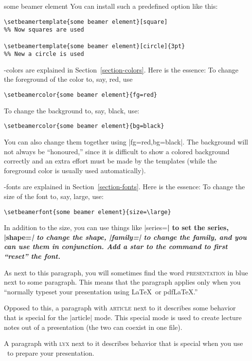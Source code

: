 \begin{element}{some beamer element}
  You can install such a predefined option like this:
\begin{verbatim}
\setbeamertemplate{some beamer element}[square]
%% Now squares are used

\setbeamertemplate{some beamer element}[circle]{3pt}
%% New a circle is used
\end{verbatim}

  \beamer-colors are explained in Section~\ref{section-colors}. Here is the essence: To change the foreground of the color to, say, red, use
\begin{verbatim}
\setbeamercolor{some beamer element}{fg=red}
\end{verbatim}

  To change the background to, say, black, use:
\begin{verbatim}
\setbeamercolor{some beamer element}{bg=black}
\end{verbatim}

  You can also change them together using |fg=red,bg=black|. The background will not always be ``honoured,'' since it is difficult to show a colored background correctly and an extra effort must be made by the templates (while the foreground color is usually used automatically).

  \beamer-fonts are explained in Section~\ref{section-fonts}. Here is the essence: To change the size of the font to, say, large, use:
\begin{verbatim}
\setbeamerfont{some beamer element}{size=\large}
\end{verbatim}

  In addition to the size, you can use things like |series=\bfseries| to set the series, |shape=\itshape| to change the shape, |family=\sffamily| to change the family, and you can use them in conjunction. Add a star to the command to first ``reset'' the font.
\end{element}

\beamernote
As next to this paragraph, you will sometimes find the word \textsc{presentation} in blue next to some paragraph. This means that the paragraph applies only when you ``normally typeset your presentation using \LaTeX\ or pdf\LaTeX.''

\articlenote
Opposed to this, a paragraph with \textsc{article} next to it describes some behavior that is special for the |article| mode. This special mode is used to create lecture notes out of a presentation (the two can coexist in one file).

\lyxnote
A paragraph with \textsc{lyx} next to it describes behavior that is special when you use \LyX\ to prepare your presentation.
\endgroup


